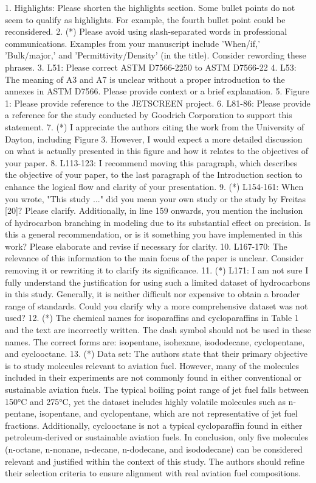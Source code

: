 \documentclass{article}
\begin{document}
1.      Highlights: Please shorten the highlights section. Some bullet points do not seem to qualify as highlights. For example, the fourth bullet point could be reconsidered.
2.      (*) Please avoid using slash-separated words in professional communications. Examples from your manuscript include 'When/if,' 'Bulk/major,' and 'Permittivity/Density' (in the title). Consider rewording these phrases.
3.      L51: Please correct ASTM D7566-2250 to ASTM D7566-22
4.      L53: The meaning of A3 and A7 is unclear without a proper introduction to the annexes in ASTM D7566. Please provide context or a brief explanation.
5.      Figure 1: Please provide reference to the JETSCREEN project.
6.      L81-86: Please provide a reference for the study conducted by Goodrich Corporation to support this statement.
7.      (*) I appreciate the authors citing the work from the University of Dayton, including Figure 3. However, I would expect a more detailed discussion on what is actually presented in this figure and how it relates to the objectives of your paper.
8.      L113-123: I recommend moving this paragraph, which describes the objective of your paper, to the last paragraph of the Introduction section to enhance the logical flow and clarity of your presentation.
9.      (*) L154-161: When you wrote, "This study ..." did you mean your own study or the study by Freitas [20]? Please clarify. Additionally, in line 159 onwards, you mention the inclusion of hydrocarbon branching in modeling due to its substantial effect on precision. Is this a general recommendation, or is it something you have implemented in this work? Please elaborate and revise if necessary for clarity.
10.     L167-170: The relevance of this information to the main focus of the paper is unclear. Consider removing it or rewriting it to clarify its significance.
11.     (*) L171: I am not sure I fully understand the justification for using such a limited dataset of hydrocarbons in this study. Generally, it is neither difficult nor expensive to obtain a broader range of standards. Could you clarify why a more comprehensive dataset was not used?
12.     (*) The chemical names for isoparaffins and cycloparaffins in Table 1 and the text are incorrectly written. The dash symbol should not be used in these names. The correct forms are: isopentane, isohexane, isododecane, cyclopentane, and cyclooctane.
13.     (*) Data set: The authors state that their primary objective is to study molecules relevant to aviation fuel. However, many of the molecules included in their experiments are not commonly found in either conventional or sustainable aviation fuels. The typical boiling point range of jet fuel falls between 150°C and 275°C, yet the dataset includes highly volatile molecules such as n-pentane, isopentane, and cyclopentane, which are not representative of jet fuel fractions. Additionally, cyclooctane is not a typical cycloparaffin found in either petroleum-derived or sustainable aviation fuels. In conclusion, only five molecules (n-octane, n-nonane, n-decane, n-dodecane, and isododecane) can be considered relevant and justified within the context of this study. The authors should refine their selection criteria to ensure alignment with real aviation fuel compositions.
\end{document}
